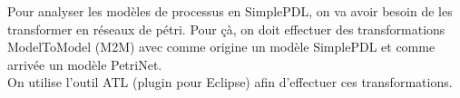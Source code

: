 Pour analyser les modèles de processus en SimplePDL, on va avoir besoin de les transformer en réseaux de pétri.
Pour çà, on doit effectuer des transformations ModelToModel (M2M) avec comme origine un modèle SimplePDL et comme arrivée un modèle PetriNet.\\

On utilise l'outil ATL (plugin pour Eclipse) afin d'effectuer ces transformations.
